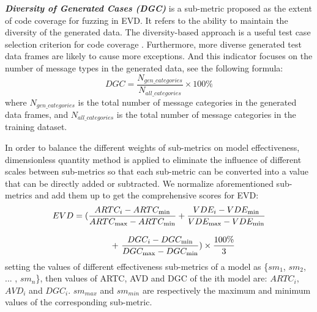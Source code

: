 \textit{\textbf{Diversity of Generated Cases (DGC)}} is a sub-metric proposed as the extent of code coverage for fuzzing in EVD. It refers to the ability to maintain the diversity of the generated data. The diversity-based approach is a useful test case selection criterion for code coverage \cite{hemmati2013achieving} \cite{mondal2015exploring}. Furthermore, more diverse generated test data frames are likely to cause more exceptions. And this indicator focuses on the number of message types in the generated data, see the following formula: 
\begin{equation}
DGC = \frac{{N_{gen\_categories}}}{{N_{all\_categories}}} \times 100\% 
\end{equation}
where $N_{gen\_categories}$ is the total number of message categories in the generated data frames, and $N_{all\_categories}$ is the total number of message categories in the training dataset.

In order to balance the different weights of sub-metrics on model effectiveness, dimensionless quantity method is applied to eliminate the influence of different scales between sub-metrics so that each sub-metric can be converted into a value that can be directly added or subtracted. We normalize aforementioned sub-metrics and add them up to get the comprehensive scores for EVD:
\begin{equation}
\begin{array}{l}
EVD=(\displaystyle\frac{{ART{C_i} - ART{C_{\min }}}}{{ART{C_{\max }} - ART{C_{\min }}}} + \frac{{VD{E_i} - VD{E_{\min }}}}{{VD{E_{\max }} - VD{{E}_{\min }}}}\\
\\{\kern 1pt} {\kern 1pt} {\kern 1pt} {\kern 1pt} {\kern 1pt} {\kern 1pt} {\kern 1pt} {\kern 1pt} {\kern 1pt} {\kern 1pt} {\kern 1pt} {\kern 1pt} {\kern 1pt} {\kern 1pt} {\kern 1pt} {\kern 1pt} {\kern 1pt} {\kern 1pt} {\kern 1pt} {\kern 1pt} {\kern 1pt} {\kern 1pt} {\kern 1pt} {\kern 1pt} {\kern 1pt} {\kern 1pt} {\kern 1pt} {\kern 1pt} {\kern 1pt} {\kern 1pt} {\kern 1pt} {\kern 1pt} {\kern 1pt} {\kern 1pt} {\kern 1pt} {\kern 1pt} {\kern 1pt} {\kern 1pt} {\kern 1pt} {\kern 1pt} {\kern 1pt} {\kern 1pt} {\kern 1pt} {\kern 1pt} {\kern 1pt} {\kern 1pt} {\kern 1pt} {\kern 1pt} {\kern 1pt} {\kern 1pt} {\kern 1pt} {\kern 1pt} {\kern 1pt} {\kern 1pt} {\kern 1pt} {\kern 1pt} {\kern 1pt} {\kern 1pt} {\kern 1pt} {\kern 1pt} {\kern 1pt} {\kern 1pt} {\kern 1pt} {\kern 1pt} {\kern 1pt} {\kern 1pt} {\kern 1pt}
+ {\kern 1pt} \displaystyle\frac{{DG{C_i} - DG{C_{\min }}}}{{DG{C_{\max }} - DG{C_{\min }}}}) \times \displaystyle\frac{{100 \% }}{3}{\kern 1pt}
\end{array}
\end{equation}
setting the values of different effectiveness sub-metrics of a model as \{${{sm}_1}$, ${{sm}_2}$, ... , ${{sm}_n}$\}, then values of ARTC, AVD and DGC of the ith model are: ${ARTC_i}$, ${AVD_i}$ and ${DGC_i}$. ${{sm}_{max}}$ and ${{sm}_{min}}$ are respectively the maximum and minimum values of the corresponding sub-metric.

